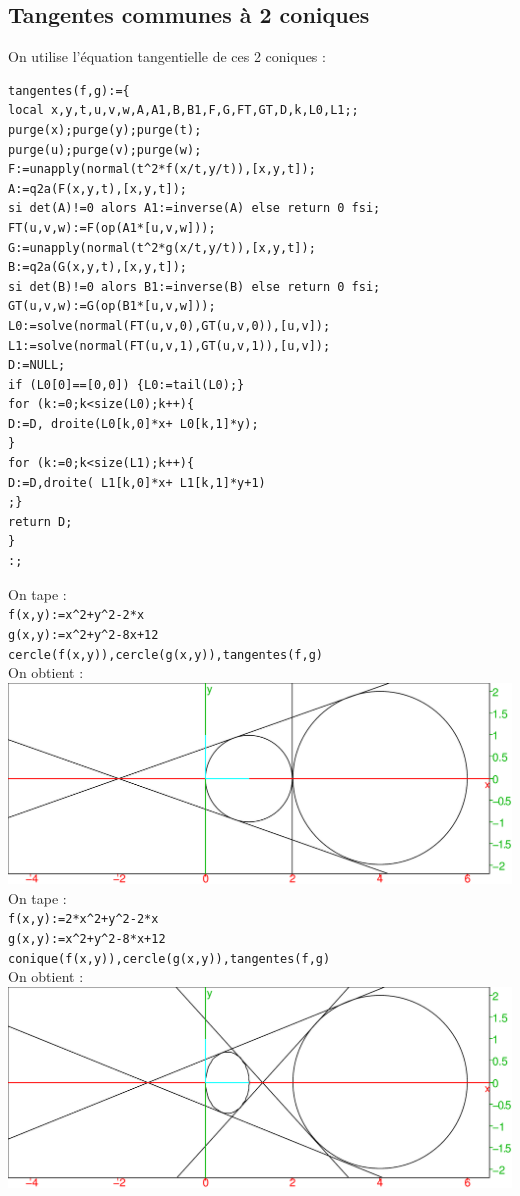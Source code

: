 \documentclass[a4paper,11pt]{book}
\begin{document}
\subsection{Tangentes communes \`a 2 coniques}
On utilise l'\'equation tangentielle de ces 2 coniques :
\begin{verbatim}
tangentes(f,g):={
local x,y,t,u,v,w,A,A1,B,B1,F,G,FT,GT,D,k,L0,L1;;
purge(x);purge(y);purge(t);
purge(u);purge(v);purge(w);
F:=unapply(normal(t^2*f(x/t,y/t)),[x,y,t]);
A:=q2a(F(x,y,t),[x,y,t]);
si det(A)!=0 alors A1:=inverse(A) else return 0 fsi;
FT(u,v,w):=F(op(A1*[u,v,w]));
G:=unapply(normal(t^2*g(x/t,y/t)),[x,y,t]);
B:=q2a(G(x,y,t),[x,y,t]);
si det(B)!=0 alors B1:=inverse(B) else return 0 fsi;
GT(u,v,w):=G(op(B1*[u,v,w]));
L0:=solve(normal(FT(u,v,0),GT(u,v,0)),[u,v]);
L1:=solve(normal(FT(u,v,1),GT(u,v,1)),[u,v]);
D:=NULL;
if (L0[0]==[0,0]) {L0:=tail(L0);}
for (k:=0;k<size(L0);k++){
D:=D, droite(L0[k,0]*x+ L0[k,1]*y);
}
for (k:=0;k<size(L1);k++){
D:=D,droite( L1[k,0]*x+ L1[k,1]*y+1)
;}
return D;
}
:;
\end{verbatim}
On tape :\\
{\tt f(x,y):=x\verb|^|2+y\verb|^|2-2*x}\\
{\tt g(x,y):=x\verb|^|2+y\verb|^|2-8x+12}\\
{\tt cercle(f(x,y)),cercle(g(x,y)),tangentes(f,g)}\\
On obtient :\\
\includegraphics[width=\textwidth]{tangentes}\\
On tape :\\
{\tt f(x,y):=2*x\verb|^|2+y\verb|^|2-2*x}\\
{\tt g(x,y):=x\verb|^|2+y\verb|^|2-8*x+12}\\
{\tt conique(f(x,y)),cercle(g(x,y)),tangentes(f,g)}\\
On obtient :\\
\includegraphics[width=\textwidth]{tangentes1}\\
\end{document}
